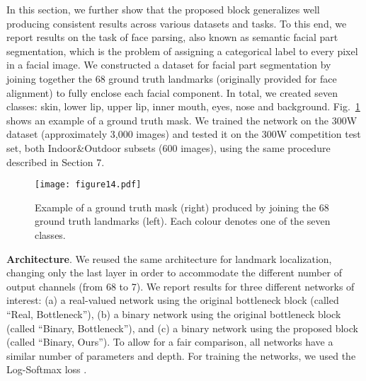 \documentclass[10pt,journal,compsoc]{IEEEtran}
\begin{document}
In this section, we further show that the proposed block generalizes well producing consistent results across various datasets and tasks. To this end, we report results on the task of face parsing, also known as semantic facial part segmentation, which is the problem of assigning a categorical label to every pixel in a facial image. We constructed a dataset for facial part segmentation by joining together the 68 ground truth landmarks (originally provided for face alignment) to fully enclose each facial component. In total, we created seven classes: skin, lower lip, upper lip, inner mouth, eyes, nose and background. Fig.{~\ref{fig:seg_gt_example}} shows an example of a ground truth  mask. We trained the network on the 300W dataset (approximately 3,000 images) and tested it on the 300W competition test set, both Indoor\&Outdoor subsets (600 images), using the same procedure described in Section 7.

\begin{figure}[!htb]
    \centering
    \texttt{[image: figure14.pdf]}
    \caption{Example of a ground truth mask (right) produced by joining the 68 ground truth landmarks (left). Each colour denotes one of the seven classes.}
    \label{fig:seg_gt_example}
\end{figure}
\textbf{Architecture}. We reused the same architecture for landmark localization, changing only the last layer in order to accommodate the different number of output channels (from 68 to 7). We report results for three different networks of interest: (a) a real-valued network using the original bottleneck block (called ``Real, Bottleneck''), (b) a binary network using the original bottleneck block (called ``Binary, Bottleneck''), and (c) a binary network using the proposed block (called ``Binary, Ours''). To allow for a fair comparison, all  networks have a similar number of parameters and depth. For training the networks, we used the Log-Softmax loss {\cite{long2015fully}}.
\end{document}
